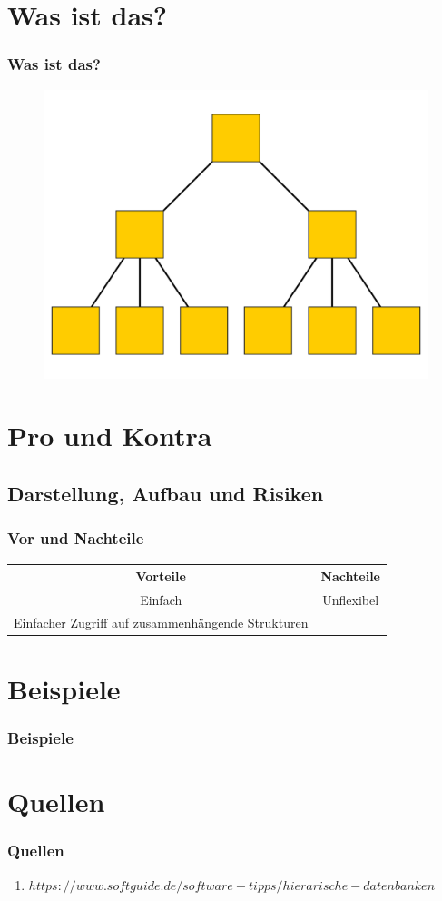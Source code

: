 \documentclass[hyperref={pdfpagelabels=false}]{beamer}
\begin{document}
\begin{frame}
\titlepage
\end{frame} 

\section{Was ist das?} 
\begin{frame}
\frametitle {Was ist das?}
\begin{figure}
\includegraphics[scale=.2]{HD.png}
\centering
\end{figure}
\end{frame}

\section{Pro und Kontra} 
\subsection{Darstellung, Aufbau und Risiken}

\begin{frame}
\frametitle{Vor und Nachteile}

\begin{tabular}{c|c}
Vorteile & Nachteile\\
\hline
Einfach & Unflexibel\\
Einfacher Zugriff auf zusammenhängende Strukturen & 
\end{tabular}

\end{frame}

\section{Beispiele} 
\begin{frame}
\frametitle{Beispiele}
\end{frame}

\section{Quellen}
\begin{frame}
\frametitle{Quellen}
\begin{enumerate} 
\item $https://www.softguide.de/software-tipps/hierarische-datenbanken$
\end{enumerate}
\end{frame}
\end{document}
